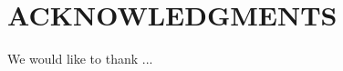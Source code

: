 \documentclass[12pt,reqno]{article} %
\begin{document}
\section*{ACKNOWLEDGMENTS}
We would like to thank ...



\label{Bibliography}

%
%
%
%
%
%
%
\end{document}
